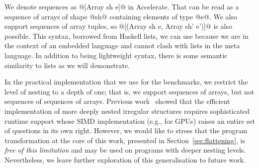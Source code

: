 We denote sequences as @[Array sh e]@ in Accelerate. That can be read as a sequence of arrays of shape @sh@ containing elements of type @e@. We also support sequences of array tuples, so @[(Array sh e, Array sh' e')]@ is also possible. This syntax, borrowed from Haskell lists, we can use because we are in the context of an embedded language and cannot clash with lists in the meta language. In addition to being lightweight syntax, there is some semantic similarity to lists as we will demonstrate.


In the practical implementation that we use for the benchmarks, we restrict the level of nesting to a depth of one; that is, we support sequences of arrays, but not sequences of sequences of arrays. Previous work~\citep{Lippmeier:replicate} showed that the efficient implementation of more deeply nested irregular structures requires sophisticated runtime support whose SIMD implementation (e.g., for GPUs) raises an entire set of questions in its own right. However, we would like to stress that the program transformation at the core of this work, presented in Section~\ref{sec:flattening}, is \emph{free of this limitation} and may be used on programs with deeper nesting levels. Nevertheless, we leave further exploration of this generalisation to future work.



%
%

